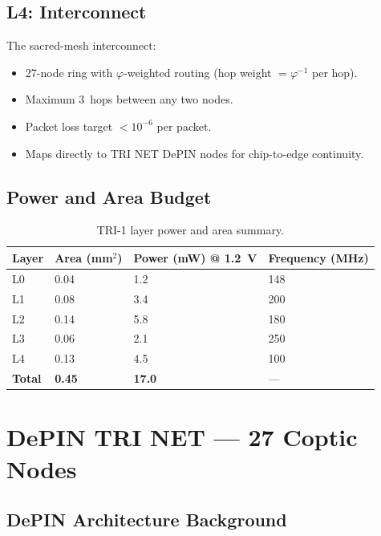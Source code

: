 \subsection{L4: Interconnect}

The sacred-mesh interconnect:
\begin{itemize}
  \item 27-node ring with \(\varphi\)-weighted routing (hop weight \(= \varphi^{-1}\)
        per hop).
  \item Maximum 3~hops between any two nodes.
  \item Packet loss target \(< 10^{-6}\) per packet.
  \item Maps directly to TRI NET DePIN nodes for chip-to-edge continuity.
\end{itemize}

\subsection{Power and Area Budget}

\begin{table}[h]
\centering
\caption{TRI-1 layer power and area summary.}
\label{tab:power-area}
\begin{tabular}{llll}
\hline
Layer & Area (mm\(^2\)) & Power (mW) @ 1.2~V & Frequency (MHz) \\
\hline
L0 & 0.04 & 1.2 & 148 \\
L1 & 0.08 & 3.4 & 200 \\
L2 & 0.14 & 5.8 & 180 \\
L3 & 0.06 & 2.1 & 250 \\
L4 & 0.13 & 4.5 & 100 \\
\textbf{Total} & \textbf{0.45} & \textbf{17.0} & — \\
\hline
\end{tabular}
\end{table}


\section{DePIN TRI NET — 27 Coptic Nodes}
\label{sec:flos74-depin}

\subsection{DePIN Architecture Background}

